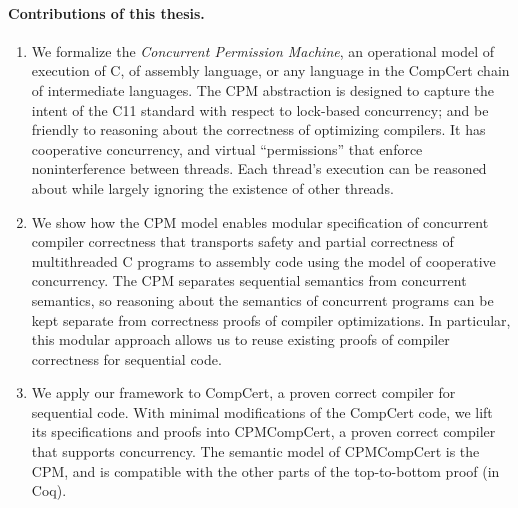 \paragraph{Contributions of this thesis.}
\begin{enumerate}
\item We formalize the \emph{Concurrent Permission Machine}, an
  operational model of execution of C, of assembly language, or any
  language in the CompCert chain of intermediate languages.  The CPM
  abstraction is designed to capture the intent of the C11 standard with respect to lock-based concurrency;
  and be friendly to reasoning about the correctness of optimizing compilers.
  It has cooperative concurrency, and virtual ``permissions'' that
  enforce noninterference between threads.  Each thread's execution
  can be reasoned about while largely ignoring the existence of other threads.
%

\item We show how the CPM model enables modular specification of
  concurrent compiler correctness that transports safety and partial
  correctness of multithreaded C programs to assembly code using the
  model of cooperative concurrency. The CPM separates sequential 
  semantics from concurrent semantics, so reasoning about the
  semantics of concurrent programs can be kept separate from correctness
  proofs of compiler optimizations. In particular, this modular approach allows 
  us to reuse existing proofs of compiler correctness for sequential code.
  
    
\item We apply our framework to CompCert, a proven correct compiler for 
	sequential code. With minimal modifications of the CompCert code, we lift its specifications 
	and proofs into CPMCompCert, a proven correct compiler that supports
	concurrency. The semantic model of CPMCompCert is the CPM, and is compatible with the 
	other parts of the top-to-bottom proof (in Coq).    

\end{enumerate}


